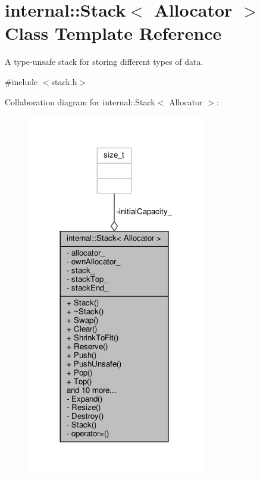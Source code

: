\hypertarget{classinternal_1_1Stack}{}\section{internal\+:\+:Stack$<$ Allocator $>$ Class Template Reference}
\label{classinternal_1_1Stack}


A type-\/unsafe stack for storing different types of data.  




{\ttfamily \#include $<$stack.\+h$>$}



Collaboration diagram for internal\+:\+:Stack$<$ Allocator $>$\+:
\nopagebreak
\begin{figure}[H]
\begin{center}
\leavevmode
\includegraphics[width=221pt]{classinternal_1_1Stack__coll__graph}
\end{center}
\end{figure}
